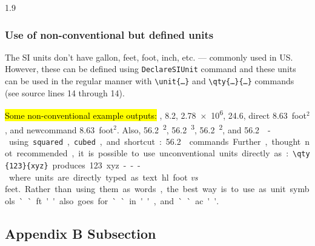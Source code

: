 \documentclass[ms-thesis,12pt,mathdesign]{ndsu-thesis-2022}
\newcommand\myspacing{1.9} %
\newcommand{\sqft}[1]{\qty{#1}{foot}$^2$\xspace}%
\newcommand{\cuft}[1]{\qty{#1}{\cubic\ft}\xspace}%
\begin{document}
\begin{spacing}{\myspacing}
\subsubsection{Use of non-conventional but defined units}
The SI units don't have gallon, feet, foot, inch, etc. --- commonly used in US. However, these can be defined using \texttt{DeclareSIUnit} command and these units can be used in the regular manner with \texttt{\textbackslash unit\{\ldots\}} and \texttt{\textbackslash qty\{\ldots\}\{\ldots\}} commands (see source lines 14 through 14). 

\hl{Some non-conventional example outputs:} \unit{\gal}, \qty{8.2}{\gal}, \qty{2.78e6}{\gal}, \qty{24.6}{\ft}, direct \qty{8.63}{foot}$^2$\xspace, and newcommand \sqft{8.63}. Also, \qty{56.2}{\ft\tothe{2}}, \qty{56.2}{\ft\tothe{3}}, \qty{56.2}{\ft\squared}, and \qty{56.2}{\cubic\ft} - using \texttt{squared}, \texttt{cubed}, and shortcut: \cuft{56.2} commands. Further, thought not recommended, it is possible to use unconventional units directly as: \verb|\qty{123}{xyz}| produces \qty{123}{xyz} --- where units are directly typed as text. 

\hl{foot \emph{vs} feet.} Rather than using them as words, the best way is to use as unit symbols ``ft'' also goes for ``in'', and ``ac''. 


\subsection{Appendix B Subsection}
\kant[11]

\closeappendices   %

\end{spacing}
\end{document}
